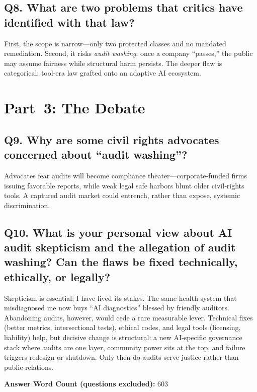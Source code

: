 \documentclass[12pt,twoside]{article}
\begin{document}
\subsection*{\textbf{Q8.} What are two problems that critics have identified with that law?}
First, the scope is narrow—only two protected classes and no mandated remediation. Second, it risks \emph{audit washing}: once a company ``passes,'' the public may assume fairness while structural harm persists. The deeper flaw is categorical: tool‑era law grafted onto an adaptive AI ecosystem.

\section{Part 3: The Debate}

\subsection*{\textbf{Q9.} Why are some civil rights advocates concerned about ``audit washing''?}
Advocates fear audits will become compliance theater—corporate‑funded firms issuing favorable reports, while weak legal safe harbors blunt older civil‑rights tools. A captured audit market could entrench, rather than expose, systemic discrimination.

\subsection*{\textbf{Q10.} What is your personal view about AI audit skepticism and the allegation of audit washing?  Can the flaws be fixed technically, ethically, or legally?}
Skepticism is essential; I have lived its stakes. The same health system that misdiagnosed me now buys ``AI diagnostics'' blessed by friendly auditors. Abandoning audits, however, would cede a rare measurable lever. Technical fixes (better metrics, intersectional tests), ethical codes, and legal tools (licensing, liability) help, but decisive change is structural: a new AI‑specific governance stack where audits are one layer, community power sits at the top, and failure triggers redesign or shutdown. Only then do audits serve justice rather than public‑relations.

\vfill
\noindent\textbf{Answer Word Count (questions excluded):} 603
\end{document}
